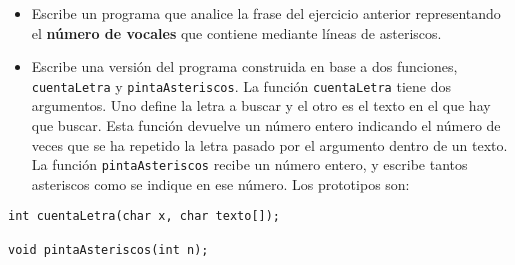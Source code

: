 \documentclass[a4paper]{article}
\begin{document}
\begin{itemize}
\item Escribe un programa que analice la frase del ejercicio anterior representando el \textbf{número de vocales} que contiene mediante líneas de asteriscos.

\item Escribe una versión del programa construida en base a dos funciones, \texttt{cuentaLetra} y \texttt{pintaAsteriscos}.
La función \texttt{cuentaLetra} tiene dos argumentos. Uno define la letra a buscar y el otro es el texto en el que hay que buscar. Esta función devuelve un número entero indicando el número de veces que se ha repetido la letra pasado por el argumento dentro de un texto.
La función \texttt{pintaAsteriscos} recibe un número entero, y escribe tantos asteriscos como se indique en ese número.
Los prototipos son:
\end{itemize}

\lstset{language=C,label= ,caption= ,captionpos=b,numbers=none}
\begin{lstlisting}
int cuentaLetra(char x, char texto[]);

void pintaAsteriscos(int n);
\end{lstlisting}
\end{document}
